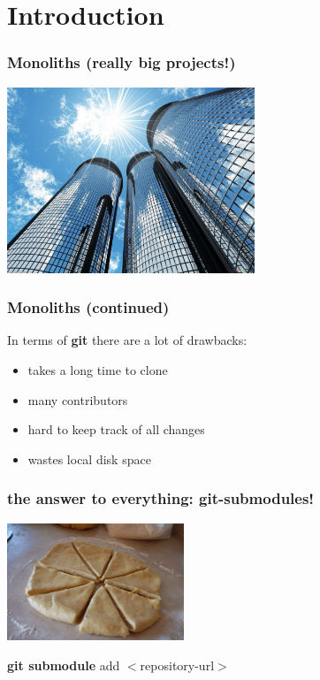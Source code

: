 \section{Introduction}
\begin{frame}
  \frametitle{Monoliths (really big projects!)}
  \begin{center}\includegraphics[width=280px]{images/monoliths.jpg}\end{center}
\end{frame}

\begin{frame}
  \frametitle{Monoliths (continued)}
  In terms of \textbf{git} there are a lot of drawbacks:
  \begin{itemize}
  	\item takes a long time to clone
  	\item many contributors
  	\item hard to keep track of all changes
  	\item wastes local disk space
  \end{itemize}  
\end{frame}

\begin{frame}
  \frametitle{the answer to everything: git-submodules!}
  \begin{center}\includegraphics[width=200px]{images/divide.jpg}\end{center}
  \begin{center}\textbf{git submodule }add $<$repository-url$>$\end{center}
\end{frame}